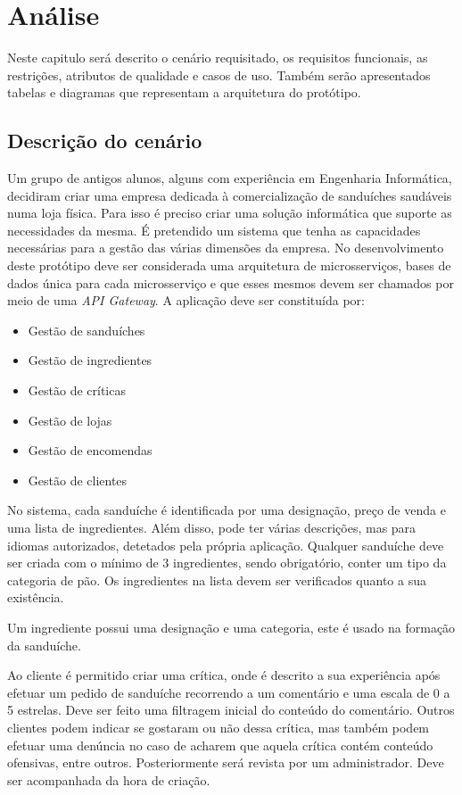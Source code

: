 \chapter{Análise}	%
\label{Chapter4}

Neste capitulo será descrito o cenário requisitado, os requisitos funcionais, as restrições, atributos de qualidade e casos de uso. Também serão apresentados tabelas e diagramas que representam a arquitetura do protótipo.

\section{Descrição do cenário}

Um grupo de antigos alunos, alguns com experiência em Engenharia Informática, decidiram criar uma empresa dedicada à comercialização de sanduíches saudáveis numa loja física. Para isso é preciso criar uma solução informática que suporte as necessidades da mesma. É pretendido um sistema que tenha as capacidades necessárias para a gestão das várias dimensões da empresa. No desenvolvimento deste protótipo deve ser considerada uma arquitetura de microsserviços, bases de dados única para cada microsserviço e que esses mesmos devem ser chamados por meio de uma \textit{API Gateway}. A aplicação deve ser constituída por:
\begin{itemize}
\item Gestão de sanduíches
\item Gestão de ingredientes
\item Gestão de críticas
\item Gestão de lojas
\item Gestão de encomendas
\item Gestão de clientes
\end{itemize}

No sistema, cada sanduíche é identificada por uma designação, preço de venda e uma lista de ingredientes. Além disso, pode ter várias descrições, mas para idiomas autorizados, detetados pela própria aplicação. Qualquer sanduíche deve ser criada com o mínimo de 3 ingredientes, sendo obrigatório, conter um tipo da categoria de pão. Os ingredientes na lista devem ser verificados quanto a sua existência.

Um ingrediente possui uma designação e uma categoria, este é usado na formação da sanduíche.

Ao cliente é permitido criar uma crítica, onde é descrito a sua experiência após efetuar um pedido de sanduíche recorrendo a um comentário e uma escala de 0 a 5 estrelas. Deve ser feito uma filtragem inicial do conteúdo do comentário. Outros clientes podem indicar se gostaram ou não dessa crítica, mas também podem efetuar uma denúncia no caso de acharem que aquela crítica contém conteúdo ofensivas, entre outros. Posteriormente será revista por um administrador. Deve ser acompanhada da hora de criação.

